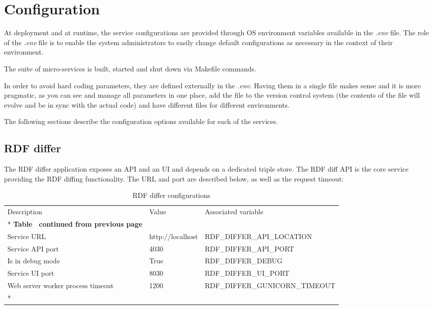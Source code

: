\section{Configuration}
\label{sec:configuration}
At deployment and at runtime, the service configurations are provided through OS environment variables available in the \textit{.env} file. The role of the \textit{.env} file is to enable the system administrators to easily change default configurations as necessary in the context of their environment.

The suite of micro-services is built, started and shut down via Makefile commands.

In order to avoid hard coding parameters, they are defined externally in the \textit{.env}. Having them in a single file makes  sense and it is more pragmatic, as you can see and manage all parameters in one place, add the file to the version control system (the contents of the file will evolve and be in sync with the actual code) and have different files for different environments.

The following sections describe the configuration options available for each of the services.

\subsection{RDF differ}

The RDF differ application exposes an API and an UI and depends on a dedicated triple store. The RDF diff API is the core service providing the RDF diffing functionality. The URL and port are described below, as well as the request timeout:

\begin{longtable}[c]{@{}p{3.5cm}p{3.5cm}l@{}}
	\toprule
	Description                       & Value            & Associated variable            \\* \midrule
	\endfirsthead
	\multicolumn{3}{c}%
	{{\bfseries Table \thetable\ continued from previous page}}                           \\
	\endhead
	\bottomrule
	\endfoot
	\endlastfoot
	Service URL                       & http://localhost & RDF\_DIFFER\_API\_LOCATION     \\
	Service API port                  & 4030             & RDF\_DIFFER\_API\_PORT         \\
	Is in debug mode                  & True             & RDF\_DIFFER\_DEBUG             \\
	Service UI port                   & 8030             & RDF\_DIFFER\_UI\_PORT          \\
	Web server worker process timeout & 1200             & RDF\_DIFFER\_GUNICORN\_TIMEOUT \\* \bottomrule
	\caption{RDF differ configurations}
	\label{tab:my-table1}                                                                 \\
\end{longtable}

